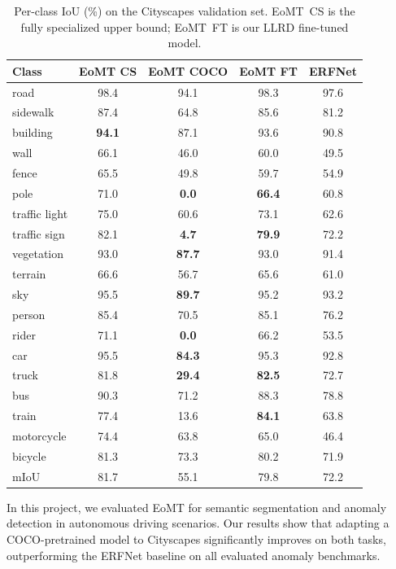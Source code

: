 \documentclass[10pt,twocolumn,letterpaper]{article}
\begin{document}
\begin{table}[t]
\centering
\caption{Per-class IoU (\%) on the Cityscapes validation set. EoMT~CS is the
fully specialized upper bound; EoMT~FT is our LLRD fine-tuned model.}
\label{tab:perclass}
\small
\setlength{\tabcolsep}{4pt}
\begin{tabular}{lcccc}
\toprule
Class & EoMT CS & EoMT COCO & EoMT FT & ERFNet \\
\midrule
road          & 98.4 & 94.1 & 98.3 & 97.6 \\
sidewalk      & 87.4 & 64.8 & 85.6 & 81.2 \\
building      & \textbf{94.1} & 87.1 & 93.6 & 90.8 \\
wall          & 66.1 & 46.0 & 60.0 & 49.5 \\
fence         & 65.5 & 49.8 & 59.7 & 54.9 \\
pole          & 71.0 &  \textbf{0.0} & \textbf{66.4} & 60.8 \\
traffic light & 75.0 & 60.6 & 73.1 & 62.6 \\
traffic sign  & 82.1 &  \textbf{4.7} & \textbf{79.9} & 72.2 \\
vegetation    & 93.0 & \textbf{87.7} & 93.0 & 91.4 \\
terrain       & 66.6 & 56.7 & 65.6 & 61.0 \\
sky           & 95.5 & \textbf{89.7} & 95.2 & 93.2 \\
person        & 85.4 & 70.5 & 85.1 & 76.2 \\
rider         & 71.1 &  \textbf{0.0} & 66.2 & 53.5 \\
car           & 95.5 & \textbf{84.3} & 95.3 & 92.8 \\
truck         & 81.8 & \textbf{29.4} & \textbf{82.5} & 72.7 \\
bus           & 90.3 & 71.2 & 88.3 & 78.8 \\
train         & 77.4 & 13.6 & \textbf{84.1} & 63.8 \\
motorcycle    & 74.4 & 63.8 & 65.0 & 46.4 \\
bicycle       & 81.3 & 73.3 & 80.2 & 71.9 \\
\midrule
mIoU          & 81.7 & 55.1 & 79.8 & 72.2 \\
\bottomrule
\end{tabular}
\end{table}

In this project, we evaluated EoMT for semantic segmentation and anomaly detection in autonomous driving scenarios. Our results show that adapting a COCO-pretrained model to Cityscapes significantly improves on both tasks, outperforming the ERFNet baseline on all evaluated anomaly benchmarks.
\end{document}
